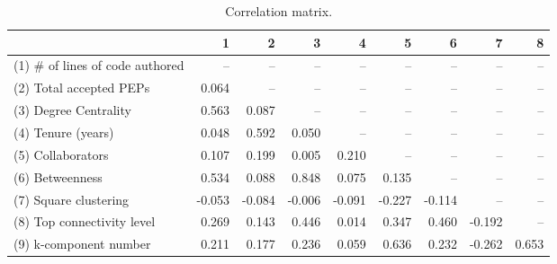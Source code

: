 \begin{table}
\caption{Correlation matrix.}
\begin{center}
\begin{tabular}{lrrrrrrrr}
\toprule
{} &      1 &      2 &      3 &      4 &      5 &      6 &      7 &     8 \\
\midrule
(1) \# of lines of code authored &    -- &    -- &    -- &    -- &    -- &    -- &    -- &   -- \\
(2) Total accepted PEPs         &  0.064 &    -- &    -- &    -- &    -- &    -- &    -- &   -- \\
(3) Degree Centrality           &  0.563 &  0.087 &    -- &    -- &    -- &    -- &    -- &   -- \\
(4) Tenure (years)              &  0.048 &  0.592 &  0.050 &    -- &    -- &    -- &    -- &   -- \\
(5) Collaborators               &  0.107 &  0.199 &  0.005 &  0.210 &    -- &    -- &    -- &   -- \\
(6) Betweenness                 &  0.534 &  0.088 &  0.848 &  0.075 &  0.135 &    -- &    -- &   -- \\
(7) Square clustering           & -0.053 & -0.084 & -0.006 & -0.091 & -0.227 & -0.114 &    -- &   -- \\
(8) Top connectivity level      &  0.269 &  0.143 &  0.446 &  0.014 &  0.347 &  0.460 & -0.192 &   -- \\
(9) k-component number          &  0.211 &  0.177 &  0.236 &  0.059 &  0.636 &  0.232 & -0.262 & 0.653 \\
\bottomrule
\end{tabular}
\end{center} 
\end{table}
